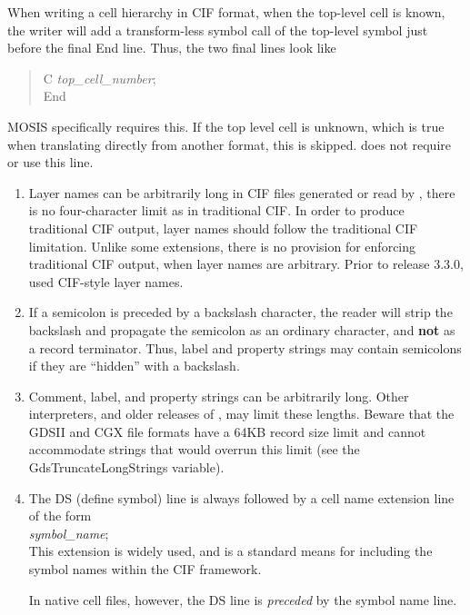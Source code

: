 When writing a cell hierarchy in CIF format, when the top-level cell
is known, the writer will add a transform-less symbol call of the
top-level symbol just before the final {\vt End} line.  Thus, the two
final lines look like
\begin{quote}
{\vt C} {\it top\_cell\_number\/}{\vt ;}\\
{\vt End}
\end{quote}
MOSIS specifically requires this.  If the top level cell is unknown,
which is true when translating directly from another format, this is
skipped.  {\Xic} does not require or use this line.

\begin{enumerate}
\item{Layer names can be arbitrarily long in CIF files generated or
read by {\Xic}, there is no four-character limit as in traditional
CIF.  In order to produce traditional CIF output, layer names should
follow the traditional CIF limitation.  Unlike some extensions, there
is no provision for enforcing traditional CIF output, when layer
names are arbitrary.  Prior to release 3.3.0, {\Xic} used CIF-style
layer names.}

\item{If a semicolon is preceded by a backslash character, the reader
will strip the backslash and propagate the semicolon as an ordinary
character, and {\bf not} as a record terminator.  Thus, label and
property strings may contain semicolons if they are ``hidden'' with a
backslash.}

\item{Comment, label, and property strings can be arbitrarily long. 
Other interpreters, and older releases of {\Xic}, may limit these
lengths.  Beware that the GDSII and CGX file formats have a 64KB
record size limit and cannot accommodate strings that would overrun
this limit (see the {\et GdsTruncateLongStrings} variable).}

\item The {\vt DS} (define symbol) line is always followed by a cell name
extension line of the form\\
{ {\it symbol\_name\/};}\\
This extension is widely used, and is a standard means for including
the symbol names within the CIF framework.

In native cell files, however, the {\vt DS} line is {\it preceded} by
the symbol name line.


\end{enumerate}
